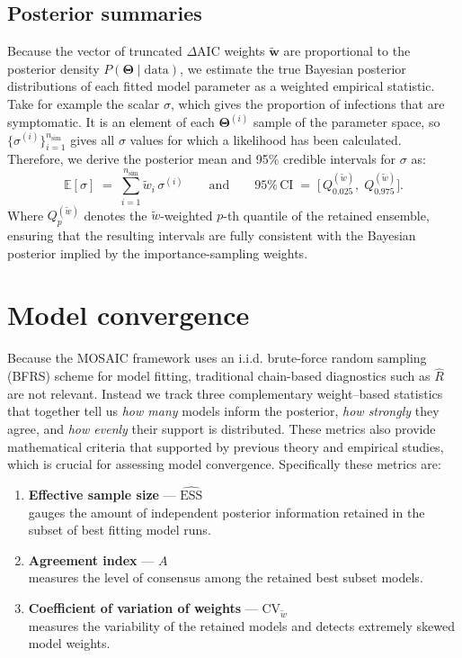 \documentclass[
]{book}
\providecommand{\tightlist}{%
  \setlength{\itemsep}{0pt}\setlength{\parskip}{0pt}}
\begin{document}
\subsection{Posterior summaries}\label{posterior-summaries}

Because the vector of truncated \(\Delta \text{AIC}\) weights \(\mathbf{\tilde{w}}\) are proportional to the posterior density \(P(\boldsymbol{\Theta}\mid\text{data})\), we estimate the true Bayesian posterior distributions of each fitted model parameter as a weighted empirical statistic. Take for example the scalar \(\sigma\), which gives the proportion of infections that are symptomatic. It is an element of each \(\boldsymbol{\Theta}^{(i)}\) sample of the parameter space, so \(\bigl\{\sigma^{(i)}\bigr\}_{i=1}^{n_{\text{sim}}}\) gives all \(\sigma\) values for which a likelihood has been calculated. Therefore, we derive the posterior mean and 95\% credible intervals for \(\sigma\) as:
\begin{equation}
\mathbb{E}[\sigma] \;=\; \sum_{i=1}^{n_{\text{sim}}} \tilde{w}_i\,\sigma^{(i)}
\qquad \text{and} \qquad
95\% \, \text{CI} \;=\; \bigl[\,Q^{(\tilde{w})}_{0.025},\; Q^{(\tilde{w})}_{0.975}\bigr].
\label{eq:weighted-posterior}
\end{equation}
Where \(Q^{(\tilde{w})}_{p}\) denotes the \(\tilde{w}\)-weighted \(p\)-th quantile of the retained ensemble, ensuring that the resulting intervals are
fully consistent with the Bayesian posterior implied by the importance-sampling weights.

\section{Model convergence}\label{model-convergence}

Because the MOSAIC framework uses an i.i.d. brute-force random sampling (BFRS) scheme for model fitting, traditional chain-based diagnostics such as \(\hat R\) are not relevant. Instead we track three complementary weight--based statistics that together tell us \emph{how many} models inform the posterior, \emph{how strongly} they agree, and \emph{how evenly} their support is distributed. These metrics also provide mathematical criteria that supported by previous theory and empirical studies, which is crucial for assessing model convergence. Specifically these metrics are:

\begin{enumerate}
\def\labelenumi{\arabic{enumi}.}
\tightlist
\item
  \textbf{Effective sample size} --- \(\widehat{\text{ESS}}\)\\
  gauges the amount of independent posterior information retained in the subset of best fitting model runs.
\item
  \textbf{Agreement index} --- \(A\)\\
  measures the level of consensus among the retained best subset models.
\item
  \textbf{Coefficient of variation of weights} --- \(\mathrm{CV}_{\tilde w}\)\\
  measures the variability of the retained models and detects extremely skewed model weights.
\end{enumerate}
\end{document}
